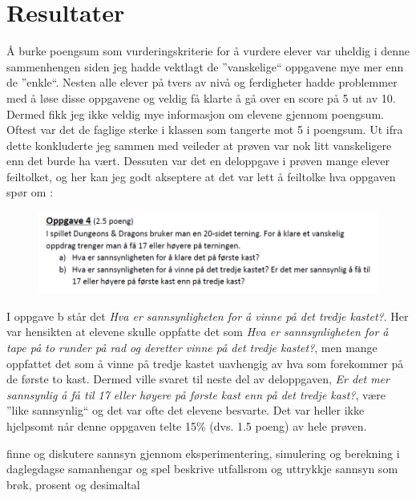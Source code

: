 \documentclass[main.tex]{subfiles}
\begin{document}
\section*{Resultater}
\label{sec:4}

Å burke poengsum som vurderingskriterie for å vurdere elever var uheldig i denne sammenhengen siden jeg hadde vektlagt
de ''vanskelige`` oppgavene mye mer enn de ''enkle``. Nesten alle elever på tvers av nivå og ferdigheter hadde 
problemmer med å løse disse oppgavene og veldig få klarte å gå over en score på 5 ut av 10. Dermed fikk jeg ikke 
veldig mye informasjon om elevene gjennom poengsum. Oftest var det de faglige sterke i klassen som tangerte
mot 5 i poengsum. Ut ifra dette konkluderte jeg sammen med veileder at prøven var nok litt vanskeligere enn
det burde ha vært. Dessuten var det en deloppgave i prøven mange elever feiltolket, og her kan jeg godt
akseptere at det var lett å feiltolke hva oppgaven spør om :
\par
\begin{figure}[h!]
\includegraphics[scale = 0.7]{../figures/oppgave4b.png}
\end{figure}
I oppgave b står det \emph{Hva er sannsynligheten for å vinne på det tredje kastet?}. Her var hensikten at
elevene skulle oppfatte det som \emph{Hva er sannsynligheten for å tape på to runder på rad og deretter vinne på det tredje kastet?},
men mange oppfattet det som å vinne på tredje kastet uavhengig av hva som forekommer på de første to kast.
Dermed ville svaret til neste del av deloppgaven, \emph{Er det mer sannsynlig å få til 17 eller høyere på første kast enn
på det tredje kast?},  være ''like sannsynlig`` og det var ofte det elevene besvarte. Det var heller ikke hjelpsomt når 
denne oppgaven telte 15\% (dvs. 1.5 poeng) av hele prøven.  

finne og diskutere sannsyn gjennom eksperimentering, simulering og berekning i daglegdagse samanhengar og spel
beskrive utfallsrom og uttrykkje sannsyn som brøk, prosent og desimaltal
\end{document}
